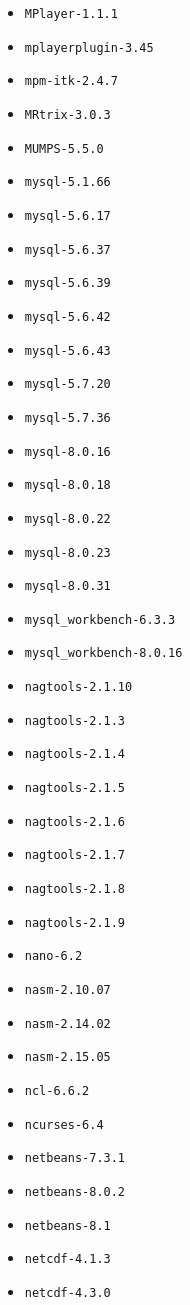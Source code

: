 \begin{multicols}{3}
\begin{itemize}
\item \verb|MPlayer-1.1.1|
\item \verb|mplayerplugin-3.45|
\item \verb|mpm-itk-2.4.7|
\item \verb|MRtrix-3.0.3|
\item \verb|MUMPS-5.5.0|
\item \verb|mysql-5.1.66|
\item \verb|mysql-5.6.17|
\item \verb|mysql-5.6.37|
\item \verb|mysql-5.6.39|
\item \verb|mysql-5.6.42|
\item \verb|mysql-5.6.43|
\item \verb|mysql-5.7.20|
\item \verb|mysql-5.7.36|
\item \verb|mysql-8.0.16|
\item \verb|mysql-8.0.18|
\item \verb|mysql-8.0.22|
\item \verb|mysql-8.0.23|
\item \verb|mysql-8.0.31|
\item \verb|mysql_workbench-6.3.3|
\item \verb|mysql_workbench-8.0.16|
\item \verb|nagtools-2.1.10|
\item \verb|nagtools-2.1.3|
\item \verb|nagtools-2.1.4|
\item \verb|nagtools-2.1.5|
\item \verb|nagtools-2.1.6|
\item \verb|nagtools-2.1.7|
\item \verb|nagtools-2.1.8|
\item \verb|nagtools-2.1.9|
\item \verb|nano-6.2|
\item \verb|nasm-2.10.07|
\item \verb|nasm-2.14.02|
\item \verb|nasm-2.15.05|
\item \verb|ncl-6.6.2|
\item \verb|ncurses-6.4|
\item \verb|netbeans-7.3.1|
\item \verb|netbeans-8.0.2|
\item \verb|netbeans-8.1|
\item \verb|netcdf-4.1.3|
\item \verb|netcdf-4.3.0|

\end{itemize}
\end{multicols}
